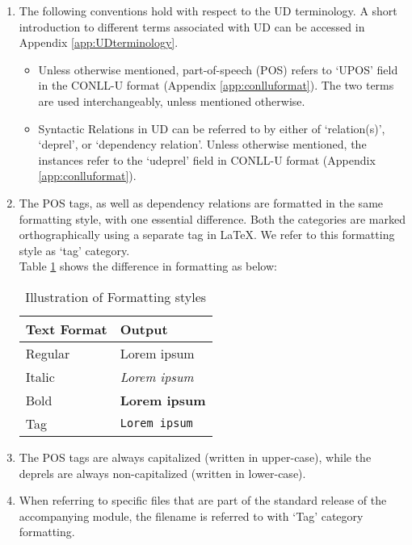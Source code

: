 \begin{enumerate}
    \item The following conventions hold with respect to the UD terminology. A short introduction to different terms associated with UD can be accessed in Appendix \ref{app:UDterminology}.
    \begin{itemize}
        \item Unless otherwise mentioned, part-of-speech (POS) refers to `UPOS' field in the CONLL-U format (Appendix \ref{app:conlluformat}). The two terms are used interchangeably, unless mentioned otherwise.
        \item Syntactic Relations in UD can be referred to by either of `relation(s)', `deprel', or `dependency relation'. Unless otherwise mentioned, the instances refer to the `udeprel' field in CONLL-U format (Appendix \ref{app:conlluformat}).
    \end{itemize}
    
    \item The POS tags, as well as dependency relations are formatted in the same formatting style, with one essential difference. Both the categories are marked orthographically using a separate tag in \LaTeX. We refer to this formatting style as `tag' category. \\
    Table \ref{tab:formats} shows the difference in formatting as below:

        \begin{table}[H]
            \centering
            \begin{tabular}{|l|l|}
            \hline
            Text Format & Output \\
            \hline \hline
            Regular & Lorem ipsum \\
            Italic & \textit{Lorem ipsum}\\
            Bold & \textbf{Lorem ipsum}\\
            Tag & \verb|Lorem ipsum| \\
            \hline
        \end{tabular}
        \caption{Illustration of Formatting styles}
        \label{tab:formats}
        \end{table}

    \item The POS tags are always capitalized (written in upper-case), while the deprels are always non-capitalized (written in lower-case).
    
    \item When referring to specific files that are part of the standard release of the accompanying module, the filename is referred to with `Tag' category formatting.
    

\end{enumerate}
